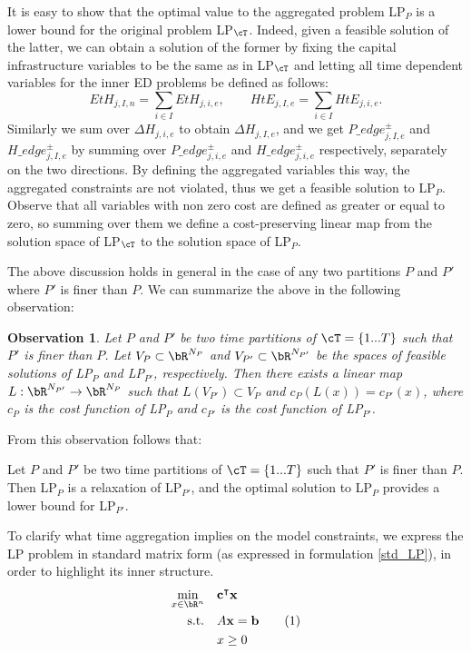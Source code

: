 \documentclass[smallextended,natbib]{svjour3}       %
\newtheorem{observation}[theorem]{Observation}
\numberwithin{theorem}{section}
\begin{document}
It is easy to show that the optimal value to the aggregated problem LP\(_P\) is a lower bound for the original problem LP\(_{\cT}\). 
Indeed, given a feasible solution of the latter, we can obtain a solution of the former by fixing the capital infrastructure variables to be the same as in LP\(_{\cT}\) and letting all time dependent variables for the inner ED problems be defined as follows:
\begin{equation}\label{sums var_t}
EtH_{j,I,n} = \sum_{i \in I} EtH_{j,i,e}, \quad\quad HtE_{j,I,e} = \sum_{i \in I} HtE_{j,i,e}.
\end{equation}
Similarly we sum over \(\Delta H_{j,i,e}\) to obtain \(\Delta H_{j,I,e}\), and we get \(P\_edge^\pm_{j,I,e}\) and \(H\_edge^\pm_{j,I,e}\) by summing over \(P\_edge^\pm_{j,i,e}\) and \(H\_edge^\pm_{j,i,e}\) respectively, separately on the two directions.
By defining the aggregated variables this way, the aggregated constraints are not violated, thus we get a feasible solution to LP\(_P\).
Observe that all variables with non zero cost are defined as greater or equal to zero, so summing over them we define a cost-preserving linear map from the solution space of LP\(_{\cT}\) to the solution space of LP\(_P\).

The above discussion holds in general in the case of any two partitions $P$ and $P'$ where $P'$ is finer than $P$.
We can summarize the above in the following observation:
\begin{observation}
Let $P$ and $P'$ be two time partitions of $\cT=\{1...T\}$ such that $P'$ is finer than $P$. Let \(V_{P} \subset \bR^{N_{P}}\) and \(V_{P'} \subset \bR^{N_{P'}}\) be the spaces of feasible solutions of LP\(_{P}\) and LP\(_{P'}\), respectively. Then there exists a linear map \(L: \bR^{N_{P'}} \to \bR^{N_{P}}\) such that \(L(V_{P'}) \subset V_{P}\) and \(c_{P}(L(x)) = c_{P'}(x)\), where \(c_{P}\) is the cost function of LP\(_{P}\) and \(c_{P'}\) is the cost function of LP\(_{P'}\).
\end{observation}

From this observation follows that:
\begin{proposition}
  Let $P$ and $P'$ be two time partitions of $\cT=\{1...T\}$ such that $P'$ is finer than $P$. Then LP$_P$ is a relaxation of LP$_{P'}$, and the optimal solution to LP$_{P}$ provides a lower bound for LP$_{P'}$.
\end{proposition}

To clarify what time aggregation implies on the model constraints, we express the LP problem in standard matrix form (as expressed in formulation \ref{std_LP}), in order to highlight its inner structure.
\begin{align*}\label{std_LP}
\min_{x \in \bR^{n}}\quad &\mathbf{c}^\intercal \mathbf{x} \\ 
\text{s.t.} \quad& A\mathbf{x} = \mathbf{b} \stepcounter{equation}\tag{\theequation}\\
&x \geq 0
\end{align*}
\end{document}
